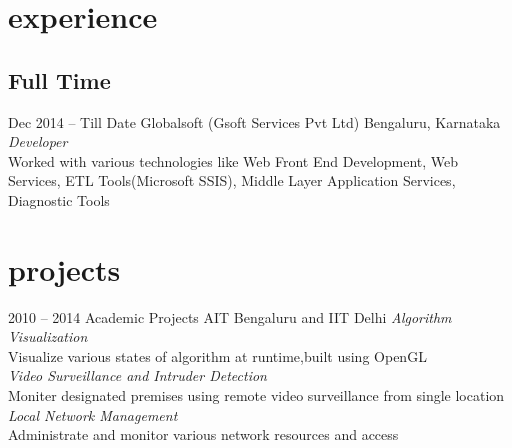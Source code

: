 \documentclass[print]{friggeri-cv} %
\begin{document}

\section{experience}

\subsection{Full Time}

\begin{entrylist}


\entry
{Dec 2014 -- Till Date }
{Globalsoft {\normalfont(Gsoft Services Pvt Ltd)}}
{Bengaluru, Karnataka}
{\emph{Developer} \\
Worked with various technologies like Web Front End Development, Web Services, ETL Tools(Microsoft SSIS), Middle Layer Application Services, Diagnostic Tools }

\end{entrylist}



\section{projects}

\begin{entrylist}

\entry
{2010 -- 2014}
{Academic Projects}
{AIT Bengaluru and IIT Delhi}
{\emph{Algorithm Visualization}\\
Visualize various states of algorithm at runtime,built using OpenGL\\

\emph{Video Surveillance and Intruder Detection}\\
Moniter designated premises using remote video surveillance from single location\\

\emph{Local Network Management}\\
Administrate and monitor various network resources and access}
\end{entrylist}
\end{document}
